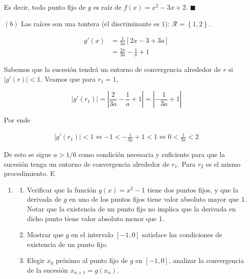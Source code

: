 \documentclass[12pt]{article}
\begin{document}
Es decir, todo punto fijo de $g$ es raíz de $f(x) = x^2 -3x + 2$. $\blacksquare$

$(b)$ Las raíces son una tontera (el discriminante es $1$): $\mathcal{R} =
\left\{ 1, 2 \right\} $. 


\begin{align*}
    g'(x) 
    &= \frac{1}{3a} \left[ 2x - 3 + 3a \right] \\ 
    &=\frac{2x}{3a} - \frac{1}{a} + 1 
\end{align*}

Sabemos que la sucesión tendrá un entorno de convergencia alrededor de $r$  si
$\left| g'(r) \right| < 1$. Veamos que para $r_1 = 1$, 

\begin{equation*}
    \left| g'(r_1) \right| 
    = \left| \frac{2}{3a} - \frac{1}{a} + 1 \right| 
    = \left| -\frac{1}{3a} + 1 \right| 
\end{equation*}

Por ende 

\begin{align*}
    \left| g'(r_1) \right| < 1 \iff -1 < -\frac{1}{3a} + 1 < 1 \iff 0 <
    \frac{1}{3a} < 2
\end{align*}

De esto se sigue $a > 1 / 6$ como condición necesaria y suficiente para que la
sucesión tenga un entorno de convergencia alrededor de $r_1$. Para $r_2$ es el
mismo procedimiento. E

\pagebreak 

\begin{myframe}
    \begin{enumerate}
    \item[13.] 
    \begin{enumerate}
        \item[a)] Verificar que la función $g(x) = x^2 - 1$ tiene dos puntos fijos, y que la derivada de $g$ en uno de los puntos fijos tiene valor absoluto mayor que 1. Notar que la existencia de un punto fijo no implica que la derivada en dicho punto tiene valor absoluto menor que 1.
        
        \item[b)] Mostrar que $g$ en el intervalo $[-1,0]$ satisface las condiciones de existencia de un punto fijo.
        
        \item[c)] Elegir $x_0$ próximo al punto fijo de $g$ en $[-1,0]$, analizar la convergencia de la sucesión $x_{n+1} = g(x_n)$.
    \end{enumerate}
\end{enumerate}
\end{myframe}
\end{document}
